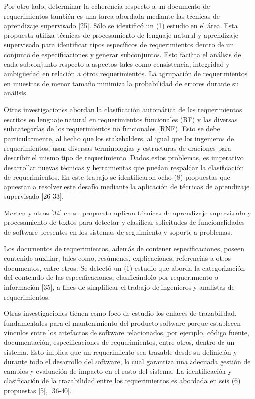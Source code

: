 \documentclass[journal]{IEEEtran}
\begin{document}
Por otro lado, determinar la coherencia respecto a un documento de requerimientos también es una tarea abordada mediante las técnicas de aprendizaje supervisado \cite{nikora2009automated}[25]. Sólo se identificó un (1) estudio en el área. Esta propuesta utiliza técnicas de procesamiento de lenguaje natural y aprendizaje supervisado para identificar tipos específicos de requerimientos dentro de un conjunto de especificaciones y generar subconjuntos. Esto facilita el análisis de cada subconjunto respecto a aspectos tales como consistencia, integridad y ambigüedad en relación a otros requerimientos. La agrupación de requerimientos en muestras de menor tamaño minimiza la probabilidad de errores durante su análisis.

Otras investigaciones abordan la clasificación automática de los requerimientos escritos en lenguaje natural en requerimientos funcionales (RF) y las diversas subcategorías de los requerimientos no funcionales (RNF). Esto se debe particularmente, al hecho que los stakeholders, al igual que los ingenieros de requerimientos, usan diversas terminologías y estructuras de oraciones para describir el mismo tipo de requerimiento. Dados estos problemas, es imperativo desarrollar nuevas técnicas y herramientas que puedan respaldar la clasificación de requerimientos. En este trabajo se identificaron ocho (8) propuestas que apuestan a resolver este desafío mediante la aplicación de técnicas de aprendizaje supervisado \cite{li2017identifying,Jindal20162027,kurtanovic2017automatically,dekhtyar2017re,abad2017works,Slankas2013,Slankas2013a}[26-33].

Merten y otros \cite{Merten2016}[34] en su propuesta aplican técnicas de aprendizaje supervisado y procesamiento de textos para detectar y clasificar solicitudes de funcionalidades de software presentes en los sistemas de seguimiento y soporte a problemas.

Los documentos de requerimientos, además de contener especificaciones, poseen contenido auxiliar, tales como, resúmenes, explicaciones, referencias a otros documentos, entre otros. Se detectó un (1) estudio que aborda la categorización del contenido de las especificaciones, clasificándolo por requerimiento o información \cite{winkler2016automatic}[35], a fines de simplificar el trabajo de ingenieros y analistas de requerimientos.

Otras investigaciones tienen como foco de estudio los enlaces de trazabilidad, fundamentales para el mantenimiento del producto software porque establecen vínculos entre los artefactos de software relacionados, por ejemplo, código fuente, documentación, especificaciones de requerimientos, entre otros, dentro de un sistema. Esto implica que un requerimiento sea trazable desde su definición y durante todo el desarrollo del software, lo cual garantiza una adecuada gestión de cambios y evaluación de impacto en el resto del sistema. La identificación y clasificación de la trazabilidad entre los requerimientos es abordada en seis (6) propuestas [5], \cite{Cleland-Huang2010,gokyer2008non,Mills2017,Sardinha2013,AtasM.2018}[36-40].
\end{document}
